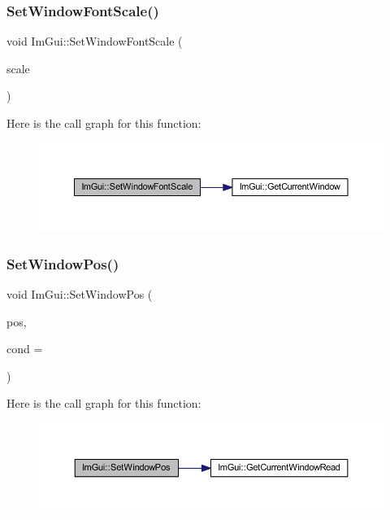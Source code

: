 \subsubsection{\texorpdfstring{Set\+Window\+Font\+Scale()}{SetWindowFontScale()}}
{\footnotesize\ttfamily void Im\+Gui\+::\+Set\+Window\+Font\+Scale (\begin{DoxyParamCaption}\item[{float}]{scale }\end{DoxyParamCaption})}

Here is the call graph for this function\+:
\nopagebreak
\begin{figure}[H]
\begin{center}
\leavevmode
\includegraphics[width=350pt]{namespace_im_gui_a11f2f343dbc9b00ccd9e99ebd59cfe8b_cgraph}
\end{center}
\end{figure}
\mbox{\label{namespace_im_gui_aaa81e004de4c0a5cedb836e92e8aa0e5}} 
\subsubsection{\texorpdfstring{Set\+Window\+Pos()}{SetWindowPos()}\hspace{0.1cm}{\footnotesize\ttfamily [1/2]}}
{\footnotesize\ttfamily void Im\+Gui\+::\+Set\+Window\+Pos (\begin{DoxyParamCaption}\item[{const \mbox{\hyperlink{struct_im_vec2}{Im\+Vec2}} \&}]{pos,  }\item[{\mbox{\hyperlink{imgui_8h_aef890d6ac872e12c5804d0b3e4f7f103}{Im\+Gui\+Cond}}}]{cond = {} }\end{DoxyParamCaption})}

Here is the call graph for this function\+:
\nopagebreak
\begin{figure}[H]
\begin{center}
\leavevmode
\includegraphics[width=350pt]{namespace_im_gui_aaa81e004de4c0a5cedb836e92e8aa0e5_cgraph}
\end{center}
\end{figure}
\mbox{\label{namespace_im_gui_a32032b56f975bb3145adbe19f38f3b56}} 
